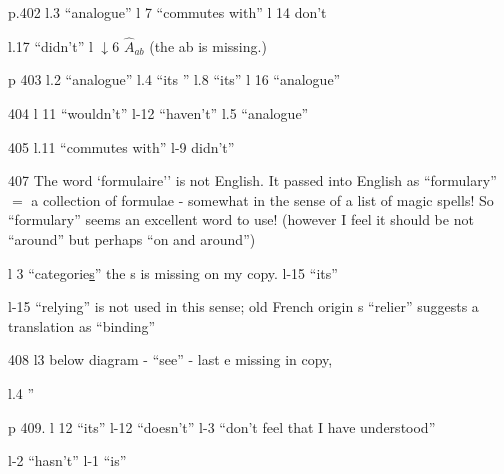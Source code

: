 
p.402 l.3 ``analogue'' \quad l 7 ``commutes with'' \quad l 14 don't

l.17 ``didn't'' \quad l $\downarrow$6 $\hat{A}_{ab}$ (the ab is missing.)

p 403 l.2 ``analogue'' \quad l.4 ``its '' \quad l.8 ``its'' \quad l 16 ``analogue''

404 l 11 ``wouldn't'' \quad l-12 ``haven't'' \quad l.\unsure{+|-}5 ``analogue''

405 l.11 ``commutes with'' \quad l-9 didn't''

407 The word `formulaire'' is not English. It passed into English as ``formulary'' $=$ a collection of formulae - somewhat in the sense of a list of magic spells! So ``formulary'' seems an excellent word to use! (however I feel it should be not ``around'' but perhaps ``on and around'')

l 3 ``categorie\uline{s}'' the s is missing on my copy. \quad l-15 ``its''

l-15 ``relying'' is not used in this sense;  old French origin s  ``relier'' suggests a translation as ``binding''

408 l3 below diagram - ``see'' - last e missing in copy,

l.4  \quad '' \quad {}

p 409. l 12 ``its'' \quad l-12 ``doesn't'' \quad l-3 ``don't feel that I have understood''

l-2 ``hasn't'' \quad l-1 ``is''

